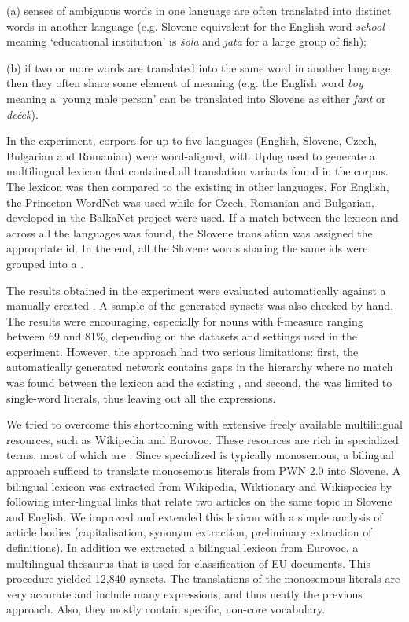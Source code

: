 \documentclass[output=paper]{LSP/langsci}
\begin{document}
(a) senses of ambiguous words in one language are often translated into distinct words in another language (e.g. Slovene equivalent for the English word \textit{school} meaning `educational institution' is \textit{šola} and \textit{jata} for a large group of fish);

(b) if two or more words are translated into the same word in another language, then they often share some element of meaning (e.g. the English word \textit{boy} meaning a `young male person' can be translated into Slovene as either \textit{fant} or \textit{deček}).

In the experiment, corpora for up to five languages (English, Slovene, Czech, Bulgarian and Romanian) were word-aligned, with Uplug \citep{Tiedemann2003} used to generate a multilingual lexicon that contained all translation variants found in the corpus. The lexicon was then compared to the existing  in other languages. For English, the Princeton WordNet \citep{Fellbaum1998} was used while for Czech, Romanian and Bulgarian,  developed in the BalkaNet project \citep{Tufis2000} were used. If a match between the lexicon and  across all the languages was found, the Slovene translation was assigned the appropriate  id. In the end, all the Slovene words sharing the same  ids were grouped into a .

The results obtained in the experiment were evaluated automatically against a manually created . A sample of the generated synsets was also checked by hand. The results were encouraging, especially for nouns with f-measure ranging between 69 and 81\%, depending on the datasets and settings used in the experiment. However, the approach had two serious limitations: first, the automatically generated network contains gaps in the hierarchy where no match was found between the lexicon and the existing , and second, the  was limited to single-word literals, thus leaving out all the  expressions.

We tried to overcome this shortcoming with extensive freely available multilingual resources, such as Wikipedia and Eurovoc. These resources are rich in specialized terms, most of which are . Since specialized  is typically monosemous, a bilingual approach sufficed to translate monosemous literals from PWN 2.0 into Slovene. A bilingual lexicon was extracted from Wikipedia, Wiktionary and Wikispecies by following inter-lingual links that relate two articles on the same topic in Slovene and English. We improved and extended this lexicon with a simple analysis of article bodies (capitalisation, synonym extraction, preliminary extraction of definitions). In addition we extracted a bilingual lexicon from Eurovoc, a multilingual thesaurus that is used for classification of EU documents. This procedure yielded 12,840 synsets. The translations of the monosemous literals are very accurate and include many  expressions, and thus neatly  the previous  approach. Also, they mostly contain specific, non-core vocabulary.
\end{document}
